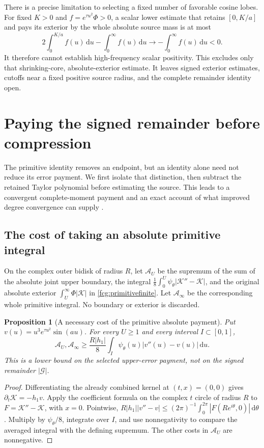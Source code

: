 \documentclass[11pt]{article}
\numberwithin{equation}{section}
\newtheorem{proposition}[theorem]{Proposition}
\newcommand{\dd}{\,\mathrm d}
\begin{document}
There is a precise limitation to selecting a fixed number of favorable
cosine lobes. For fixed $K>0$ and $f=e^{\tau u^2}\Phi>0$, a scalar
lower estimate that retains $[0,K/a]$ and pays its exterior by the
whole absolute source mass is at most
\[
 2\int_0^{K/a}f(u)\dd u-\int_0^\infty f(u)\dd u
       \longrightarrow-\int_0^\infty f(u)\dd u<0.
\]
It therefore cannot establish high-frequency scalar positivity.
This excludes only that shrinking-core, absolute-exterior estimate.
It leaves signed exterior estimates, cutoffs near a fixed positive
source radius, and the complete remainder identity open.

\section{Paying the signed remainder before compression}
\label{fcg:paidremainders}

The primitive identity removes an endpoint, but an identity alone need
not reduce its error payment. We first isolate that distinction, then
subtract the retained Taylor polynomial before estimating the source.
This leads to a convergent complete-moment payment and an exact account
of what improved degree convergence can supply
\cite{FCGPrimitiveCost,FCGSubtractedTail,FCGGaussianSlack}.

\subsection{The cost of taking an absolute primitive integral}

On the complex outer bidisk of radius $R$, let $\mathcal A_U$ be the
supremum of the sum of the absolute joint upper boundary, the integral
$\frac18\int_0^U\psi_\theta|\mathscr K''-\mathscr K|$, and the original
absolute exterior $\int_U^\infty\Phi|\mathscr K|$ in
\eqref{fcg:primitivefinite}. Let $\mathcal A_\infty$ be the corresponding
whole primitive integral. No boundary or exterior is discarded.

\begin{proposition}[A necessary cost of the primitive absolute payment]
\label{fcg:primitivecost}
Put $v(u)=u^3e^{\tau u^2}\sin(au)$. For every $U\ge1$ and every
interval $I\subset[0,1]$,
\begin{equation}\label{fcg:primitivecostbound}
 \mathcal A_U,\mathcal A_\infty
 \ge\frac{R|h_1|}{8}\int_I\psi_\theta(u)|v''(u)-v(u)|\dd u.
\end{equation}
This is a lower bound on the selected upper-error payment, not on
the signed remainder $|\mathcal G|$.
\end{proposition}
\begin{proof}
Differentiating the already combined kernel at $(t,x)=(0,0)$ gives
$\partial_t\mathscr K=-h_1v$. Apply the coefficient formula on the
complex $t$ circle of radius $R$ to
$F=\mathscr K''-\mathscr K$, with $x=0$. Pointwise,
$R|h_1||v''-v|\le(2\pi)^{-1}\int_0^{2\pi}|F(Re^{i\theta},0)|\dd\theta$.
Multiply by $\psi_\theta/8$, integrate over $I$, and use nonnegativity
to compare the averaged integral with the defining supremum. The
other costs in $\mathcal A_U$ are nonnegative.
\end{proof}
\end{document}
